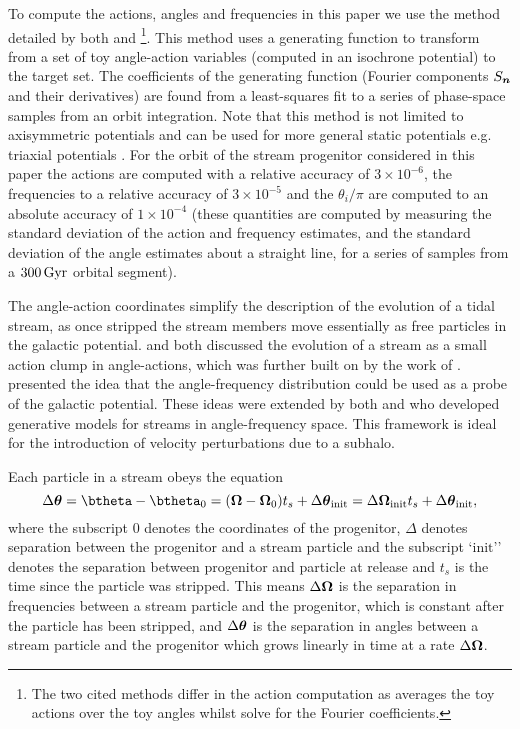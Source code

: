 \documentclass[useAMS,usenatbib,fleqn,a4paper]{mn2e}
\def\Gyr{\,{\rm Gyr}}
\newcommand{\bs}[1]{\bmath{#1}}
\begin{document}
To compute the actions, angles and frequencies in this paper we use the method detailed by both \cite{SandersBinney2014} and \cite{Bovy2014}\footnote{The two cited methods differ in the action computation as \cite{Bovy2014} averages the toy actions over the toy angles whilst \cite{SandersBinney2014} solve for the Fourier coefficients.}. This method uses a generating function to transform from a set of toy angle-action variables (computed in an isochrone potential) to the target set. The coefficients of the generating function (Fourier components $S_{\bs{n}}$ and their derivatives) are found from a least-squares fit to a series of phase-space samples from an orbit integration. Note that this method is not limited to axisymmetric potentials and can be used for more general static potentials e.g. triaxial potentials \citep[see][]{SandersBinney2014}. For the orbit of the stream progenitor considered in this paper the actions are computed with a relative accuracy of $3\times10^{-6}$, the frequencies to a relative accuracy of $3\times10^{-5}$ and the $\theta_i/\pi$ are computed to an absolute accuracy of $1\times10^{-4}$ (these quantities are computed by measuring the standard deviation of the action and frequency estimates, and the standard deviation of the angle estimates about a straight line, for a series of samples from a $300\Gyr$ orbital segment).

The angle-action coordinates simplify the description of the evolution of a tidal stream, as once stripped the stream members move essentially as free particles in the galactic potential. \cite{HelmiWhite1999} and \cite{Tremaine1999} both discussed the evolution of a stream as a small action clump in angle-actions, which was further built on by the work of \cite{EyreBinney2011}. \cite{SandersBinney2013b} presented the idea that the angle-frequency distribution could be used as a probe of the galactic potential. These ideas were extended by both \cite{Bovy2014} and \cite{Sanders2014} who developed generative models for streams in angle-frequency space. This framework is ideal for the introduction of velocity perturbations due to a subhalo.

Each particle in a stream obeys the equation
\begin{equation}\label{linearevol}
\Delta\bs{\theta} = \btheta-\btheta_0 = (\boldsymbol{\Omega}-\boldsymbol{\Omega}_0)t_s +\Delta\bs{\theta}_\mathrm{init}= \Delta\bs{\Omega}_\mathrm{init}t_s+\Delta\bs{\theta}_\mathrm{init},
\end{equation}
where the subscript $0$ denotes the coordinates of the progenitor, $\Delta$ denotes separation between the progenitor and a stream particle and the subscript `$\mathrm{init}$'' denotes the separation between progenitor and particle at release and $t_s$ is the time since the particle was stripped. This means $\Delta\bs{\Omega}$ is the separation in frequencies between a stream particle and the progenitor, which is constant after the particle has been stripped, and $\Delta\bs{\theta}$ is the separation in angles between a stream particle and the progenitor which grows linearly in time at a rate $\Delta\bs{\Omega}$.
\end{document}
